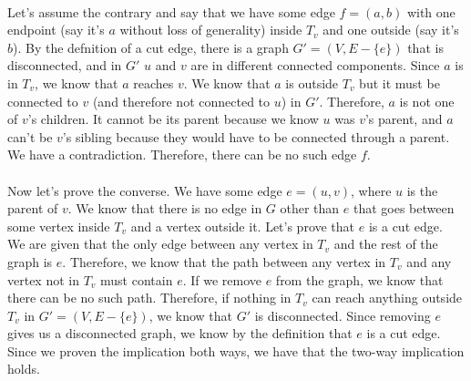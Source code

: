 \documentclass[11pt]{article}
\begin{document}
\begin{solution}
\begin{itemize}
            \\ Let's assume the contrary and say that we have some edge $f = (a, b)$ with one endpoint (say it's $a$ without loss of generality) inside $T_v$ and one outside (say it's $b$). By the defnition of a cut edge, there is a graph $G' = (V, E - \{e\})$ that is disconnected, and in $G'$ $u$ and $v$ are in different connected components. Since $a$ is in $T_v$, we know that $a$ reaches $v$. We know that $a$ is outside $T_v$ but it must be connected to $v$ (and therefore not connected to $u$) in $G'$. Therefore, $a$ is not one of $v$'s children. It cannot be its parent because we know $u$ was $v$'s parent, and $a$ can't be $v$'s sibling because they would have to be connected through a parent. We have a contradiction. Therefore, there can be no such edge $f$.
            \\ \\ Now let's prove the converse. We have some edge $e = (u, v)$, where $u$ is the parent of $v$. We know that there is no edge in $G$ other than $e$ that goes between some vertex inside $T_v$ and a vertex outside it. Let's prove that $e$ is a cut edge.
            \\ We are given that the only edge between any vertex in $T_v$ and the rest of the graph is $e$. Therefore, we know that the path between any vertex in $T_v$ and any vertex not in $T_v$ must contain $e$. If we remove $e$ from the graph, we know that there can be no such path. Therefore, if nothing in $T_v$ can reach anything outside $T_v$ in $G' = (V, E - \{e\})$, we know that $G'$ is disconnected. Since removing $e$ gives us a disconnected graph, we know by the definition that $e$ is a cut edge.
            \\ Since we proven the implication both ways, we have that the two-way implication holds. 
    \end{itemize}
\end{solution}
\end{document}
